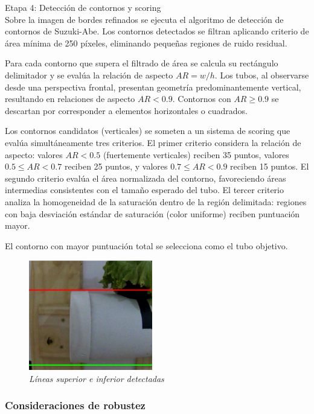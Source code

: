 Etapa 4: Detección de contornos y scoring\\
\noindent
Sobre la imagen de bordes refinados se ejecuta el algoritmo de detección de contornos de Suzuki-Abe. Los contornos detectados se filtran aplicando criterio de área mínima de 250 píxeles, eliminando pequeñas regiones de ruido residual.

Para cada contorno que supera el filtrado de área se calcula su rectángulo delimitador y se evalúa la relación de aspecto $AR = w/h$. Los tubos, al observarse desde una perspectiva frontal, presentan geometría predominantemente vertical, resultando en relaciones de aspecto $AR < 0.9$. Contornos con $AR \geq 0.9$ se descartan por corresponder a elementos horizontales o cuadrados.

Los contornos candidatos (verticales) se someten a un sistema de scoring que evalúa simultáneamente tres criterios. El primer criterio considera la relación de aspecto: valores $AR < 0.5$ (fuertemente verticales) reciben 35 puntos, valores $0.5 \leq AR < 0.7$ reciben 25 puntos, y valores $0.7 \leq AR < 0.9$ reciben 15 puntos. El segundo criterio evalúa el área normalizada del contorno, favoreciendo áreas intermedias consistentes con el tamaño esperado del tubo. El tercer criterio analiza la homogeneidad de la saturación dentro de la región delimitada: regiones con baja desviación estándar de saturación (color uniforme) reciben puntuación mayor.

El contorno con mayor puntuación total se selecciona como el tubo objetivo.

\begin{figure}[H]
    \centering
    \includegraphics[width=0.48\textwidth]{imagenes/detector_tubos_6_lineas.png}
    \caption{\textit{Líneas superior e inferior detectadas}}
    \label{fig:detector_tubos_lineas}
\end{figure}

\subsubsection{Consideraciones de robustez}

